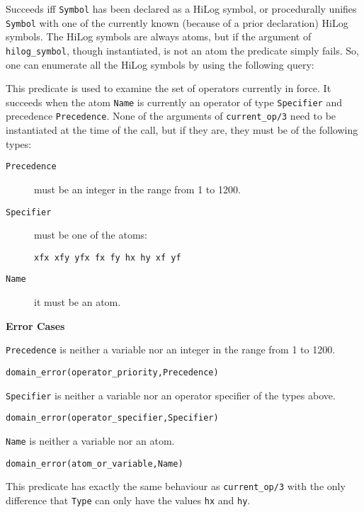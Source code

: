 \begin{description}
    Succeeds iff {\tt Symbol} has been declared as a HiLog symbol, or 
    procedurally unifies {\tt Symbol} with one of the currently known 
    (because of a prior declaration) HiLog symbols. The HiLog symbols
    are always atoms, but if the argument of {\tt hilog\_symbol},
    though instantiated, is not an atom the predicate simply fails.
    So, one can enumerate all the HiLog symbols by using the following
    query:


%
    This predicate is used to examine the set of operators currently
    in force.  It succeeds when the atom {\tt Name} is currently an
    operator of type {\tt Specifier} and precedence {\tt Precedence}.  None
    of the arguments of {\tt current\_op/3} need to be instantiated at
    the time of the call, but if they are, they must be of the
    following types: 
\begin{description}
\item[{\tt Precedence}] must be an integer in the range from 1 to 1200.  
\item[{\tt Specifier}] must be one of the atoms: 
\begin{verbatim} 
xfx xfy yfx fx fy hx hy xf yf 
\end{verbatim} 
\item[{\tt Name}] it must be an atom.
\end{description}

{\bf Error Cases}
\bi
\item 	{\tt Precedence} is neither a variable nor an integer in the
range from 1 to 1200. 
\bi
\item 	{\tt domain\_error(operator\_priority,Precedence)}
\ei
\item 	{\tt Specifier} is neither a variable nor an operator
specifier of the types above.
\bi
\item 	{\tt domain\_error(operator\_specifier,Specifier)}
\ei
\item 	{\tt Name} is neither a variable nor an atom.
\bi
\item 	{\tt domain\_error(atom\_or\_variable,Name)}
\ei
\ei

    This predicate has exactly the same behaviour as {\tt current\_op/3}
    with the only difference that {\tt Type} can only have the values
    {\tt hx} and {\tt hy}.
\end{description}


